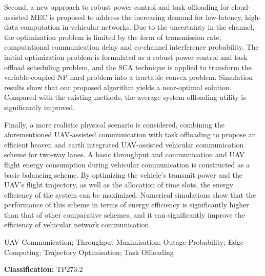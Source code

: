 Second, a new approach to robust power control and task offloading for cloud-assisted MEC is proposed to address the increasing demand for low-latency,
high-data computation in vehicular networks. Due to the uncertainty in the channel, the optimization problem is limited by the form of transmission rate,
computational communication delay and co-channel interference probability. The initial optimization problem is formulated as a robust power control and
task offload scheduling problem, and the SCA technique is applied to transform the variable-coupled NP-hard problem into a tractable convex problem.
Simulation results show that our proposed algorithm yields a near-optimal solution. Compared with the existing methods, the average system offloading
utility is significantly improved.

Finally, a more realistic physical scenario is considered, combining the aforementioned UAV-assisted communication with task offloading to propose an
efficient heaven and earth integrated UAV-assisted vehicular communication scheme for two-way lanes. A basic throughput and communication and UAV flight
energy consumption during vehicular communication is constructed as a basic balancing scheme. By optimizing the vehicle's transmit power and the UAV's flight
trajectory, as well as the allocation of time slots, the energy efficiency of the system can be maximized. Numerical simulations show that the performance of
this scheme in terms of energy efficiency is significantly higher than that of other comparative schemes, and it can significantly improve the efficiency of
vehicular network communication.

\begin{englishkeywords}
UAV Communication; Throughput Maximisation; Outage Probability; Edge Computing; Trajectory Optimisation; Task Offloading
\end{englishkeywords}

\noindent\textbf{Classification:} TP273.2
\cleardoublepage%

\makeatletter
{}
\pagestyle{fancy}
  \fancyhf{}
\makeatother
